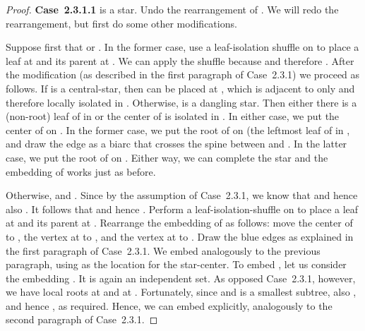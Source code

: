 \documentclass[11pt,a4paper,colorlinks=true,urlcolor=blue,citecolor=red]{article}
\theoremstyle{plain}
\newcommand{\case}[1]{\par\vspace{.5\baselineskip}\noindent\textbf{\sffamily Case~#1}}
\begin{document}
\begin{proof}
  \case{2.3.1.1}  is a star. Undo the rearrangement of . We will
  redo the rearrangement, but first do some other modifications.

  Suppose first that  or
  . In the former case, use a leaf-isolation
  shuffle on  to place a leaf at  and its parent at
  . We can apply the shuffle because  and therefore
  . After the modification (as described in the first
  paragraph of Case~2.3.1) we proceed as follows. If  is a
  central-star, then  can be placed at , which is adjacent to
   only and therefore locally isolated in .
  Otherwise,  is a dangling star. Then either there is a (non-root)
  leaf of  in  or the center  of  is isolated
  in . In either case, we put the center of  on .
  In the former case, we put the root of  on  (the leftmost
  leaf of  in , and draw the edge  as a
  biarc that crosses the spine between  and . In the
  latter case, we put the root of  on . Either way, we can
  complete the star  and the embedding of  works just as before.

  Otherwise,  and
  . Since  by the
  assumption of Case~2.3.1, we know that
   and hence also
  . It follows that  and
  hence . Perform a leaf-isolation-shuffle on 
  to place a leaf at  and its parent at . Rearrange the
  embedding of  as follows: move the center  of  to
  , the vertex  at  to , and the vertex 
  at  to . Draw the blue edges as explained in the first
  paragraph of Case~2.3.1. We embed  analogously to the previous
  paragraph, using  as the location for the star-center. To embed
  , let us consider the embedding . It is again an
  independent set. As opposed Case~2.3.1, however, we have local roots
  at  and at . Fortunately, since  and  is
  a smallest subtree, also , and hence , as required. Hence, we can embed  explicitly,
  analogously to the second paragraph of Case~2.3.1.


\end{proof}
\end{document}
